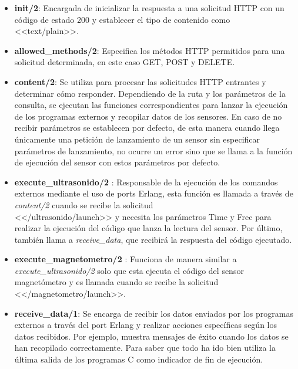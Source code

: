 \begin{itemize}
    \item \textbf{init/2}: Encargada de inicializar la respuesta a una solicitud HTTP con un código de estado 200 y establecer el tipo de contenido como <<text/plain>>.
    \item \textbf{allowed\_methods/2}: Especifica los métodos HTTP permitidos para una solicitud determinada, en este caso GET, POST y DELETE.
    \item \textbf{content/2}: Se utiliza para procesar las solicitudes HTTP entrantes y determinar cómo responder. Dependiendo de la ruta y los parámetros de la consulta, se ejecutan las funciones correspondientes para lanzar la ejecución de los programas externos y recopilar datos de los sensores. En caso de no recibir parámetros se establecen por defecto, de esta manera cuando llega únicamente una petición de lanzamiento de un sensor sin especificar parámetros de lanzamiento, no ocurre un error sino que se llama a la función de ejecución del sensor con estos parámetros por defecto.
    \item \textbf{execute\_ultrasonido/2} : Responsable de la ejecución de los comandos externos mediante el uso de ports Erlang, esta función es llamada a través de \textit{content/2} cuando se recibe la solicitud\\ <</ultrasonido/launch>> y necesita los parámetros Time y Frec para realizar la ejecución del código que lanza la lectura del sensor. Por último, también llama a \textit{receive\_data}, que recibirá la respuesta del código ejecutado.

    \item \textbf{execute\_magnetometro/2} : Funciona de manera similar a \textit{execute\_ultrasonido/2} solo que esta ejecuta el código del sensor magnetómetro y es llamada cuando se recibe la solicitud\\ <</magnetometro/launch>>.
    
    \item \textbf{receive\_data/1}: Se encarga de recibir los datos enviados por los programas externos a través del port Erlang y realizar acciones específicas según los datos recibidos. Por ejemplo, muestra mensajes de éxito cuando los datos se han recopilado correctamente. Para saber que todo ha ido bien utiliza la última salida de los programas C como indicador de fin de ejecución.
\end{itemize}

